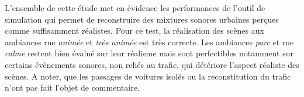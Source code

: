 L'ensemble de cette étude met en évidence les performances de l'outil de simulation qui permet de reconstruire des mixtures sonores urbaines perçues comme suffisamment réalistes. Pour ce test, la réalisation des scènes aux ambiances rue \textit{animée} et \textit{très animée} est très correcte. Les ambiances \textit{parc} et rue \textit{calme} restent bien évalué sur leur réalisme mais sont perfectibles notamment sur certains évènements sonores, non reliés au trafic, qui détériore l'aspect réaliste des scènes. A noter, que les passages de voitures isolés ou la reconstitution du trafic n'ont pas fait l'objet de commentaire.

%
%
%
%